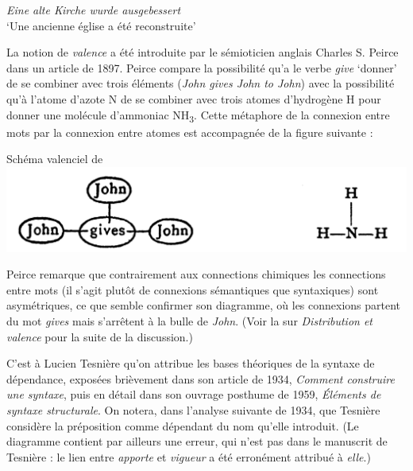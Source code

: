 {    \textit{Eine alte Kirche wurde ausgebessert}\\
    ‘Une ancienne église a été reconstruite’
    \z

    La notion de \textit{valence} a été introduite par le sémioticien anglais Charles S. Peirce dans un article de 1897. Peirce compare la possibilité qu’a le verbe \textit{give} ‘donner’ de se combiner avec trois éléments (\textit{John gives John to John}) avec la possibilité qu’à l’atome d’azote N de se combiner avec trois atomes d’hydrogène H pour donner une molécule d’ammoniac NH\textsubscript{3}. Cette métaphore de la connexion entre mots par la connexion entre atomes est accompagnée de la figure suivante :

    \ea
    Schéma valenciel de \citet{Peirce1897}
    \includegraphics[width=\textwidth]{figures/vol1syntaxe2-img016.png}
    \z

    Peirce remarque que contrairement aux connections chimiques les connections entre mots (il s’agit plutôt de connexions sémantiques que syntaxiques) sont asymétriques, ce que semble confirmer son diagramme, où les connexions partent du mot \textit{gives} mais s’arrêtent à la bulle de \textit{John}. (Voir la  sur \textit{Distribution et valence} pour la suite de la discussion.)

    C’est à Lucien Tesnière qu’on attribue les bases théoriques de la syntaxe de dépendance, exposées brièvement dans son article de 1934, \textit{Comment construire une syntaxe}, puis en détail dans son ouvrage posthume de 1959, \textit{Éléments de syntaxe structurale}. On notera, dans l’analyse suivante de 1934, que Tesnière considère la préposition comme dépendant du nom qu’elle introduit. (Le diagramme contient par ailleurs une erreur, qui n’est pas dans le manuscrit de Tesnière : le lien entre \textit{apporte} et \textit{vigueur} a été erronément attribué à \textit{elle}.)

}
